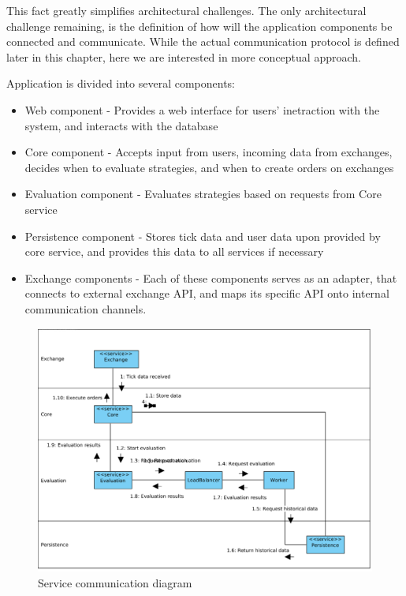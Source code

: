 This fact greatly simplifies architectural challenges. The only architectural challenge remaining, is the definition
of how will the application components be connected and communicate. While the actual communication protocol is
defined later in this chapter, here we are interested in more conceptual approach.

Application is divided into several components:
\begin{itemize}
    \item Web component - Provides a web interface for users' inetraction with the system, and interacts with the database
    \item Core component - Accepts input from users, incoming data from exchanges, decides when to evaluate strategies, and when to create orders on exchanges
    \item Evaluation component - Evaluates strategies based on requests from Core service
    \item Persistence component - Stores tick data and user data upon provided by core service, and provides this data to all services if necessary
    \item Exchange components - Each of these components serves as an adapter, that connects to external exchange API, and
    maps its specific API onto internal communication channels.
\end{itemize}

\begin{figure}[H]
    \includegraphics[width=\textwidth]{obrazky-figures/Service communication diagram.png}
    \caption{Service communication diagram}
    \label{img:service_comm}
\end{figure}


